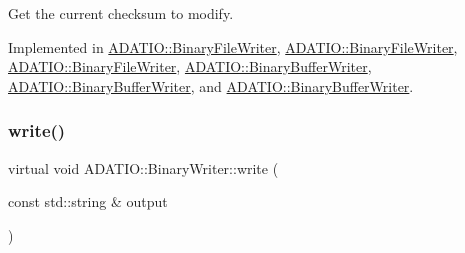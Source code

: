Get the current checksum to modify. 



Implemented in \mbox{\hyperlink{classADATIO_1_1BinaryFileWriter_a0137ec5926d08e49ed7a63c6ef33e882}{A\+D\+A\+T\+I\+O\+::\+Binary\+File\+Writer}}, \mbox{\hyperlink{classADATIO_1_1BinaryFileWriter_a0137ec5926d08e49ed7a63c6ef33e882}{A\+D\+A\+T\+I\+O\+::\+Binary\+File\+Writer}}, \mbox{\hyperlink{classADATIO_1_1BinaryFileWriter_a0137ec5926d08e49ed7a63c6ef33e882}{A\+D\+A\+T\+I\+O\+::\+Binary\+File\+Writer}}, \mbox{\hyperlink{classADATIO_1_1BinaryBufferWriter_af4cc523a862ce29a96f1a813f254360e}{A\+D\+A\+T\+I\+O\+::\+Binary\+Buffer\+Writer}}, \mbox{\hyperlink{classADATIO_1_1BinaryBufferWriter_af4cc523a862ce29a96f1a813f254360e}{A\+D\+A\+T\+I\+O\+::\+Binary\+Buffer\+Writer}}, and \mbox{\hyperlink{classADATIO_1_1BinaryBufferWriter_af4cc523a862ce29a96f1a813f254360e}{A\+D\+A\+T\+I\+O\+::\+Binary\+Buffer\+Writer}}.

\mbox{\label{classADATIO_1_1BinaryWriter_ac7731874e4949f80f0edbad2474c4b64}} 
\subsubsection{\texorpdfstring{write()}{write()}\hspace{0.1cm}{\footnotesize\ttfamily [1/36]}}
{\footnotesize\ttfamily virtual void A\+D\+A\+T\+I\+O\+::\+Binary\+Writer\+::write (\begin{DoxyParamCaption}\item[{const std\+::string \&}]{output }\end{DoxyParamCaption})\hspace{0.3cm}{\ttfamily [virtual]}}

